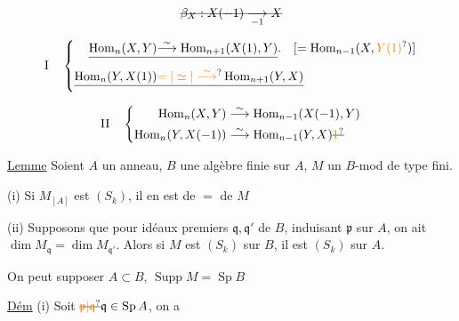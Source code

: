 
\[
\deleted{\beta_X:X(-1)\underset{-1}{\longrightarrow}X}
\]


\[
\mathrm I\quad\left\{\begin{aligned}
\deleted{\operatorname{Hom}_n(X,Y)}&\deleted{\overset{\sim}{\longrightarrow}\operatorname{Hom}_{n+1}(X(1),Y)} .
\quad [=\operatorname{Hom}_{n-1}(X,\unsure{Y(1)})]\\
\deleted{\operatorname{Hom}_n(Y,X(1))}&\deleted{\unsure{=|\simeq|\overset{\sim}{\longrightarrow}}\operatorname{Hom}_{n+1}(Y,X)}
\end{aligned}\right.
\]

\[
\mathrm {II}\quad\left\{\begin{aligned}
\operatorname{Hom}_n(X,Y)&\overset{\sim}{\longrightarrow}\operatorname{Hom}_{n-1}(X(-1),Y)\\
\operatorname{Hom}_n(Y,X(-1))&\overset{\sim}{\longrightarrow}\operatorname{Hom}_{n-1}(Y,X)\deleted{\unsure{1}}
\end{aligned}\right.
\]

 \uline{Lemme} Soient $A$ un anneau, $B$ une algèbre finie sur $A$, $M$ un $B$-mod de type fini.

(i) Si $M_{[A]}$ est $(S_k)$, il en est de $=$ de $M$

(ii) Supposons que pour  idéaux premiers $\mathfrak q,\mathfrak q'$ de $B$, induisant  $\mathfrak p$ sur $A$, on ait $\dim M_{\mathfrak q}=\dim M_{\mathfrak q'}$. Alors si $M$ est $(S_k)$ sur $B$, il est $(S_k)$ sur $A$.

On peut supposer $A\subset B$,  $\operatorname{Supp} M=\operatorname{Sp} B$

\uline{Dém} (i) Soit $\deleted{\unsure{\mathfrak p|\mathfrak q}}\mathfrak q\in\operatorname{Sp} A$,  on a

